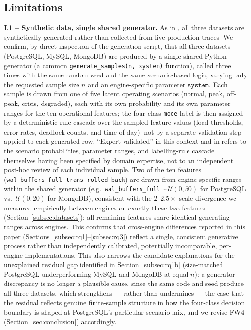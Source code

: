 \documentclass[pdflatex,sn-mathphys-num]{sn-jnl}
\theoremstyle{thmstyleone}
\theoremstyle{thmstylethree}
\begin{document}
\subsection{Limitations}\label{subsec:limitations}

\textbf{L1 -- Synthetic data, single shared generator.} As in
\cite{iaha2026}, all three datasets are synthetically generated rather
than collected from live production traces. We confirm, by direct
inspection of the generation script, that all three datasets
(PostgreSQL, MySQL, MongoDB) are produced by a single shared Python
generator (a common \texttt{generate\_samples(n, system)} function),
called three times with the same random seed and the same
scenario-based logic, varying only the requested sample size $n$ and
an engine-specific parameter $\texttt{system}$. Each sample is drawn
from one of five latent operating scenarios (normal, peak, off-peak,
crisis, degraded), each with its own probability and its own
parameter ranges for the ten operational features; the four-class
\texttt{mode} label is then assigned by a deterministic rule cascade
over the sampled feature values (load thresholds, error rates,
deadlock counts, and time-of-day), not by a separate validation step
applied to each generated row. ``Expert-validated'' in this context
and in \cite{iaha2026} refers to the scenario probabilities,
parameter ranges, and labelling-rule cascade themselves having been
specified by domain expertise, not to an independent post-hoc review
of each individual sample. Two of the ten features
(\texttt{wal\_buffers\_full}, \texttt{trans\_rolled\_back}) are drawn
from engine-specific ranges within the shared generator (e.g.\
\texttt{wal\_buffers\_full} $\sim \mathcal{U}(0,50)$ for PostgreSQL
vs.\ $\mathcal{U}(0,20)$ for MongoDB), consistent with the $2$--$2.5\times$
scale divergence we measured empirically between engines on exactly
these two features (Section~\ref{subsec:datasets}); all remaining
features share identical generating ranges across engines. This
confirms that cross-engine differences reported in this paper
(Sections~\ref{subsec:rq1}--\ref{subsec:rq3}) reflect a single,
consistent generative process rather than independently calibrated,
potentially incomparable, per-engine implementations. This also
narrows the candidate explanations for the unexplained residual gap
identified in Section~\ref{subsec:rq1b} (size-matched PostgreSQL
underperforming MySQL and MongoDB at equal $n$): a generator
discrepancy is no longer a plausible cause, since the same code and
seed produce all three datasets, which strengthens --- rather than
undermines --- the case that the residual reflects genuine
finite-sample structure in how the four-class decision boundary is
shaped at PostgreSQL's particular scenario mix, and we revise FW4
(Section~\ref{sec:conclusion}) accordingly.
\end{document}
